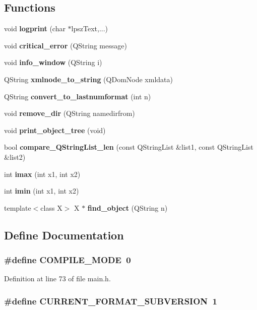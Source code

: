 \subsection*{Functions}
\begin{CompactItemize}
\item 
void {\bf logprint} (char $\ast$lpsz\-Text,...)
\item 
void {\bf critical\_\-error} (QString message)
\item 
void {\bf info\_\-window} (QString i)
\item 
QString {\bf xmlnode\_\-to\_\-string} (QDom\-Node xmldata)
\item 
QString {\bf convert\_\-to\_\-lastnumformat} (int n)
\item 
void {\bf remove\_\-dir} (QString namedirfrom)
\item 
void {\bf print\_\-object\_\-tree} (void)
\item 
bool {\bf compare\_\-QString\-List\_\-len} (const QString\-List \&list1, const QString\-List \&list2)
\item 
int {\bf imax} (int x1, int x2)
\item 
int {\bf imin} (int x1, int x2)
\item 
template$<$class X$>$ X $\ast$ {\bf find\_\-object} (QString n)
\end{CompactItemize}


\subsection{Define Documentation}
\subsubsection{\setlength{\rightskip}{0pt plus 5cm}\#define COMPILE\_\-MODE~0}\label{main_8h_2c268a5f82ee3a6df7fd780174bdffcb}




Definition at line 73 of file main.h.
\subsubsection{\setlength{\rightskip}{0pt plus 5cm}\#define CURRENT\_\-FORMAT\_\-SUBVERSION~1}\label{main_8h_c0afd906320d22ab872498bfd98b2bb9}




